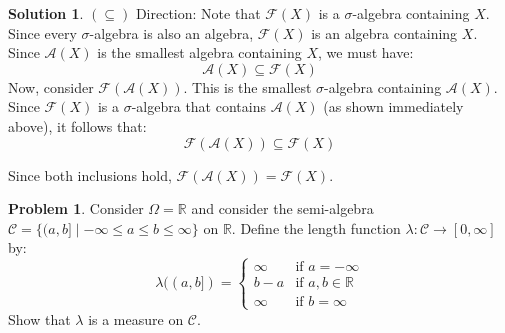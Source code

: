 \documentclass{article}
\theoremstyle{definition}
\newtheorem{problem}{Problem}
\newtheorem*{solution}{Solution}
\begin{document}
\begin{solution}
$(\subseteq)$ Direction:
Note that $\mathcal{F}(X)$ is a $\sigma$-algebra containing $X$. Since every $\sigma$-algebra is also an algebra, $\mathcal{F}(X)$ is an algebra containing $X$.
Since $\mathcal{A}(X)$ is the smallest algebra containing $X$, we must have:
\[ \mathcal{A}(X) \subseteq \mathcal{F}(X) \]
Now, consider $\mathcal{F}(\mathcal{A}(X))$. This is the smallest $\sigma$-algebra containing $\mathcal{A}(X)$. Since $\mathcal{F}(X)$ is a $\sigma$-algebra that contains $\mathcal{A}(X)$ (as shown immediately above), it follows that:
\[ \mathcal{F}(\mathcal{A}(X)) \subseteq \mathcal{F}(X) \]

\noindent Since both inclusions hold, $\mathcal{F}(\mathcal{A}(X)) = \mathcal{F}(X)$.
\end{solution}

\hrulefill

\begin{problem}
Consider $\Omega = \mathbb{R}$ and consider the semi-algebra $\mathcal{C} = \{(a, b] \mid -\infty \le a \le b \le \infty\}$ on $\mathbb{R}$. Define the length function $\lambda: \mathcal{C} \to [0, \infty]$ by:
\[ \lambda((a,b]) = \begin{cases} \infty & \text{if } a = -\infty \\ b-a & \text{if } a,b \in \mathbb{R} \\ \infty & \text{if } b = \infty \end{cases} \]
Show that $\lambda$ is a measure on $\mathcal{C}$.
\end{problem}
\end{document}
